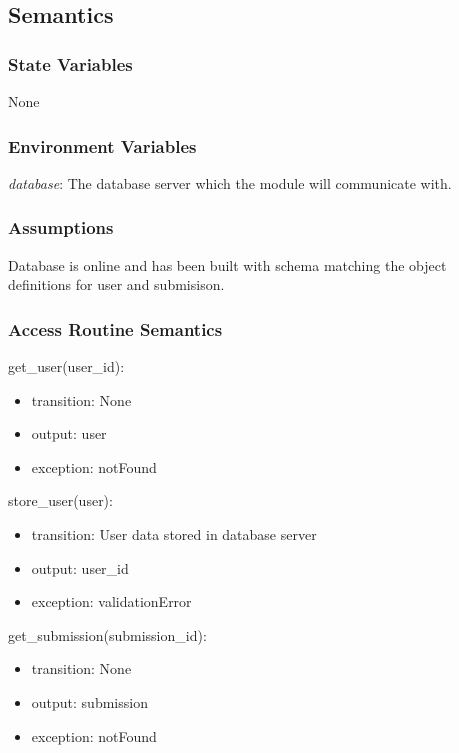 \documentclass[12pt, titlepage]{article}
\begin{document}
\subsection{Semantics}

\subsubsection{State Variables}

None

\subsubsection{Environment Variables}

\textit{database}: The database server which the module will communicate with.

\subsubsection{Assumptions}

Database is online and has been built with schema matching the object definitions for user and submisison.

\subsubsection{Access Routine Semantics}

\noindent get\_user(user\_id):
\begin{itemize}
\item transition: None
\item output: user
\item exception: notFound
\end{itemize}

\noindent store\_user(user):
\begin{itemize}
\item transition: User data stored in database server
\item output: user\_id
\item exception: validationError
\end{itemize}

\noindent get\_submission(submission\_id):
\begin{itemize}
\item transition: None
\item output: submission
\item exception: notFound
\end{itemize}
\end{document}
